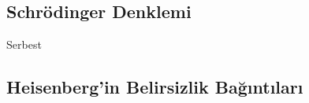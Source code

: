 \documentclass[a4paper,12pt, twoside]{article}
\begin{document}
\subsection{Schrödinger Denklemi}

Serbest

\subsection{Heisenberg'in Belirsizlik Bağıntıları}



\newpage
\renewcommand\refname{Kaynaklar}
{}
 
\end{document}
